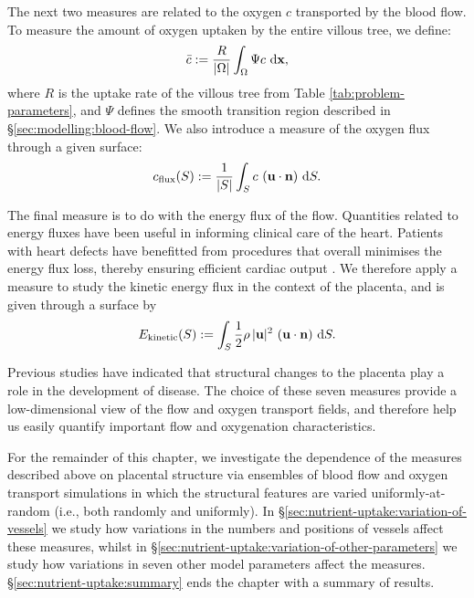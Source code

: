         The next two measures are related to the oxygen $c$ transported by the blood flow. To measure the amount of oxygen uptaken by the entire villous tree, we define:
        \begin{equation}
            \bar{c} := \frac{R}{|\Omega|} \int_\Omega \Psi c ~\mathrm{d} \boldsymbol{\mathbf{x}},
            \label{eq:eff-c}
        \end{equation}
        where $R$ is the uptake rate of the villous tree from Table \ref{tab:problem-parameters}, and $\Psi$ defines the smooth transition region described in \S\ref{sec:modelling:blood-flow}. We also introduce a measure of the oxygen flux through a given surface:
        \begin{equation}
            c_\text{flux}(S) := \frac{1}{|S|} \int_S c ~ (\boldsymbol{\mathbf{u}} \cdot \boldsymbol{\mathbf{n}}) ~\mathrm{d} S.
            \label{eq:eff-c-flux}
        \end{equation}
        
        The final measure is to do with the energy flux of the flow. Quantities related to energy fluxes have been useful in informing clinical care of the heart. Patients with heart defects have benefitted from procedures that overall minimises the energy flux loss, thereby ensuring efficient cardiac output \cite{rijnbergEnergeticsBloodFlow2018,whiteheadNonlinearPowerLoss2007}. We therefore apply a measure to study the kinetic energy flux in the context of the placenta, and is given through a surface by
        \begin{equation}
            E_\text{kinetic}(S) := \int_S \frac{1}{2} \rho \, |\boldsymbol{\mathbf{u}}|^2 ~ (\boldsymbol{\mathbf{u}} \cdot \boldsymbol{\mathbf{n}}) ~\mathrm{d} S.
            \label{eq:eff-e-kinetic}
        \end{equation}

        Previous studies have indicated that structural changes to the placenta play a role in the development of disease. The choice of these seven measures provide a low-dimensional view of the flow and oxygen transport fields, and therefore help us easily quantify important flow and oxygenation characteristics.
        
        For the remainder of this chapter, we investigate the dependence of the measures described above on placental structure via ensembles of blood flow and oxygen transport simulations in which the structural features are varied uniformly-at-random (i.e., both randomly and uniformly). In \S\ref{sec:nutrient-uptake:variation-of-vessels} we study how variations in the numbers and positions of vessels affect these measures, whilst in \S\ref{sec:nutrient-uptake:variation-of-other-parameters} we study how variations in seven other model parameters affect the measures. \S\ref{sec:nutrient-uptake:summary} ends the chapter with a summary of results.
    
